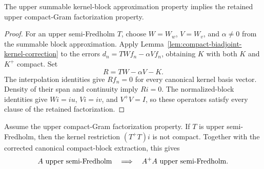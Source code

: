 \begin{lemma}
\label{lem:summable-kernel-block-factorization}
The upper summable kernel-block approximation property implies the retained upper compact-Gram
factorization property.
\leanok
\end{lemma}

\begin{proof}
For an upper semi-Fredholm $T$, choose $W=W_w$, $V=W_v$, and $\alpha\ne0$ from the summable
block approximation.  Apply Lemma~\ref{lem:compact-biadjoint-kernel-correction} to the errors
$d_n=TWf_n-\alpha Vf_n$, obtaining $K$ with both $K$ and $K^+$ compact.  Set
\[
  R=TW-\alpha V-K.
\]
The interpolation identities give $Rf_n=0$ for every canonical kernel basis vector.  Density of
their span and continuity imply $Ri=0$.  The normalized-block identities give
$Wi=iu$, $Vi=iv$, and $V^+V=I$, so these operators satisfy every clause of the retained
factorization.
\end{proof}

\begin{lemma}
\label{lem:target-compact-gram-reduction}
Assume the upper compact-Gram factorization property.  If $T$ is upper semi-Fredholm, then the
kernel restriction $(T^+T)i$ is not compact.  Together with the corrected canonical
compact-block extraction, this gives
\[
  A\ \hbox{upper semi-Fredholm}\quad\Longrightarrow\quad A^+A\
  \hbox{upper semi-Fredholm}.
\]
\leanok
\end{lemma}

